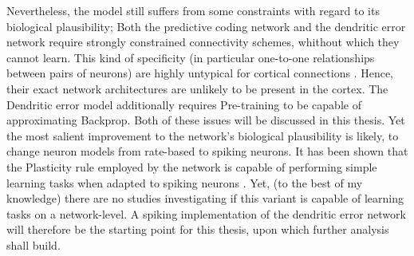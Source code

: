 Nevertheless, the model still suffers from some constraints with regard to its biological plausibility; Both the
predictive coding network and the dendritic error network require strongly constrained connectivity schemes, whithout
which they cannot learn. This kind of specificity (in particular one-to-one relationships between pairs of neurons) are
highly untypical for cortical connections \citep{Thomson2003}. Hence, their exact network architectures are unlikely to
be present in the cortex. The Dendritic error model additionally requires Pre-training to be capable of approximating
Backprop. Both of these issues will be discussed in this thesis. Yet the most salient improvement to the network's
biological plausibility is likely, to change neuron models from rate-based to spiking neurons. It has been shown that
the Plasticity rule employed by the network is capable of performing simple learning tasks when adapted to spiking
neurons \citep{Stapmanns2021}. Yet, (to the best of my knowledge) there are no studies investigating if this variant is
capable of learning tasks on a network-level. A spiking implementation of the dendritic error network will therefore be
the starting point for this thesis, upon which further analysis shall build.

